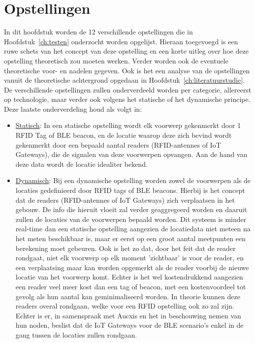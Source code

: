 
\chapter{Opstellingen}
\label{ch:opstellingen}

In dit hoofdstuk worden de 12 verschillende opstellingen die in Hoofdstuk~\ref{ch:testen} onderzocht worden opgelijst. Hieraan toegevoegd is een ruwe schets van het concept van deze opstelling en een korte uitleg over hoe deze opstelling theoretisch zou moeten werken. Verder worden ook de eventuele theoretische voor- en nadelen gegeven. Ook is het een analyse van de opstellingen vanuit de theoretische achtergrond opgedaan in Hoofdstuk~\ref{ch:literatuurstudie}. De verschillende opstellingen zullen onderverdeeld worden per categorie, allereerst op technologie, maar verder ook volgens het statische of het dynamische principe. 
Deze laatste onderverdeling houd als volgt in:
\begin{itemize}
	\item \underline{Statisch}:
	In een statische opstelling wordt elk voorwerp gekenmerkt door 1 RFID Tag of BLE beacon, en de locatie waarop deze zich bevind wordt gekenmerkt door een bepaald aantal readers (RFID-antennes of IoT Gateways), die de signalen van deze voorwerpen opvangen. Aan de hand van deze data wordt de locatie idealiter bekend.
	\item \underline{Dynamisch}:
	Bij een dynamische opstelling worden zowel de voorwerpen als de locaties gedefinieerd door RFID tags of BLE beacons. Hierbij is het concept dat de readers (RFID-antennes of IoT Gateways) zich verplaatsen in het gebouw. De info die hieruit vloeit zal verder geaggregeerd worden en daaruit zullen de locaties van de voorwerpen bepaald worden. Dit systeem is minder real-time dan een statische opstelling aangezien de locatiedata niet meteen na het meten beschikbaar is, maar er eerst op een groot aantal meetpunten een berekening moet gebeuren. Ook is het zo dat, door het feit dat de reader rondgaat, niet elk voorwerp op elk moment 'zichtbaar' is voor de reader, en een verplaatsing maar kan worden opgemerkt als de reader voorbij de nieuwe locatie van het voorwerp komt. Echter is het wel kostendrukkend aangezien een reader veel meer kost dan een tag of beacon, met een kostenvoordeel tot gevolg als hun aantal kan geminimaliseerd worden.
	In theorie kunnen deze readers overal rondgaan, welke voor een RFID opstelling ook zo zal zijn. Echter is er, in samenspraak met Aucxis en het in beschouwing nemen van hun noden, beslist dat de IoT Gateways voor de BLE scenario's enkel in de gang tussen de locaties zullen rondgaan.
\end{itemize}

